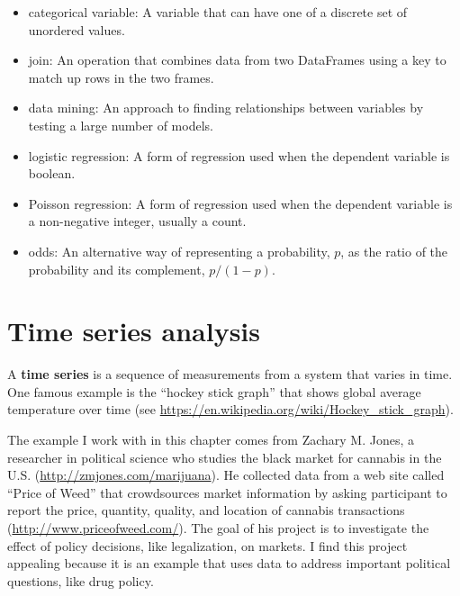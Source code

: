 \documentclass[12pt]{book}
\begin{document}
\begin{itemize}
\item categorical variable: A variable that can have one of a
discrete set of unordered values.

\item join: An operation that combines data from two DataFrames
using a key to match up rows in the two frames.

\item data mining: An approach to finding relationships between
variables by testing a large number of models.

\item logistic regression: A form of regression used when the
dependent variable is boolean.

\item Poisson regression: A form of regression used when the
dependent variable is a non-negative integer, usually a count.

\item odds: An alternative way of representing a probability, $p$, as
  the ratio of the probability and its complement, $p / (1-p)$.

\end{itemize}



\chapter{Time series analysis}

A {\bf time series} is a sequence of measurements from a system that
varies in time.  One famous example is the ``hockey stick graph'' that
shows global average temperature over time (see
\url{https://en.wikipedia.org/wiki/Hockey_stick_graph}).

The example I work with in this chapter comes from Zachary M. Jones, a
researcher in political science who studies the black market for
cannabis in the U.S.  (\url{http://zmjones.com/marijuana}).  He
collected data from a web site called ``Price of Weed'' that
crowdsources market information by asking participant to report the
price, quantity, quality, and location of cannabis transactions
(\url{http://www.priceofweed.com/}).  The goal of his project is to
investigate the effect of policy decisions, like legalization, on
markets.  I find this project appealing because it is an example that
uses data to address important political questions, like drug policy.
\end{document}
